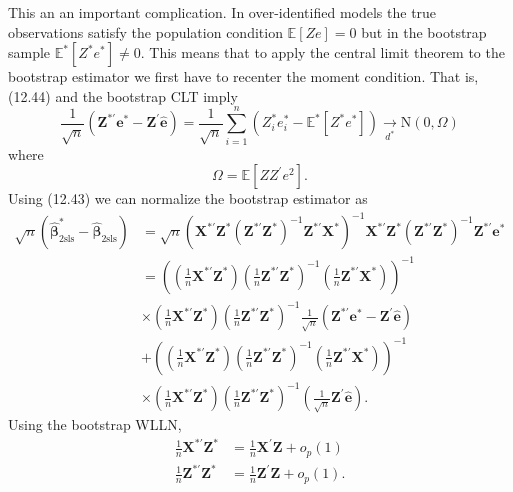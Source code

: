 \documentclass[10pt]{article}
\begin{document}
This an an important complication. In over-identified models the true observations satisfy the population condition $\mathbb{E}[Z e]=0$ but in the bootstrap sample $\mathbb{E}^{*}\left[Z^{*} e^{*}\right] \neq 0$. This means that to apply the central limit theorem to the bootstrap estimator we first have to recenter the moment condition. That is, (12.44) and the bootstrap CLT imply
$$
\frac{1}{\sqrt{n}}\left(\boldsymbol{Z}^{* \prime} \boldsymbol{e}^{*}-\boldsymbol{Z}^{\prime} \widehat{\boldsymbol{e}}\right)=\frac{1}{\sqrt{n}} \sum_{i=1}^{n}\left(Z_{i}^{*} e_{i}^{*}-\mathbb{E}^{*}\left[Z^{*} e^{*}\right]\right) \underset{d^{*}}{\longrightarrow} \mathrm{N}(0, \Omega)
$$
where
$$
\Omega=\mathbb{E}\left[Z Z^{\prime} e^{2}\right] .
$$
Using (12.43) we can normalize the bootstrap estimator as
$$
\begin{aligned}
\sqrt{n}\left(\widehat{\boldsymbol{\beta}}_{2 \mathrm{sls}}^{*}-\widehat{\boldsymbol{\beta}}_{2 \mathrm{sls}}\right) &=\sqrt{n}\left(\boldsymbol{X}^{* \prime} \boldsymbol{Z}^{*}\left(\boldsymbol{Z}^{* \prime} \boldsymbol{Z}^{*}\right)^{-1} \boldsymbol{Z}^{* \prime} \boldsymbol{X}^{*}\right)^{-1} \boldsymbol{X}^{* \prime} \boldsymbol{Z}^{*}\left(\boldsymbol{Z}^{* \prime} \boldsymbol{Z}^{*}\right)^{-1} \boldsymbol{Z}^{* \prime} \boldsymbol{e}^{*} \\
&=\left(\left(\frac{1}{n} \boldsymbol{X}^{* \prime} \boldsymbol{Z}^{*}\right)\left(\frac{1}{n} \boldsymbol{Z}^{* \prime} \boldsymbol{Z}^{*}\right)^{-1}\left(\frac{1}{n} \boldsymbol{Z}^{* \prime} \boldsymbol{X}^{*}\right)\right)^{-1} \\
& \times\left(\frac{1}{n} \boldsymbol{X}^{* \prime} \boldsymbol{Z}^{*}\right)\left(\frac{1}{n} \boldsymbol{Z}^{* \prime} \boldsymbol{Z}^{*}\right)^{-1} \frac{1}{\sqrt{n}}\left(\boldsymbol{Z}^{* \prime} \boldsymbol{e}^{*}-\boldsymbol{Z}^{\prime} \widehat{\boldsymbol{e}}\right) \\
&+\left(\left(\frac{1}{n} \boldsymbol{X}^{* \prime} \boldsymbol{Z}^{*}\right)\left(\frac{1}{n} \boldsymbol{Z}^{* \prime} \boldsymbol{Z}^{*}\right)^{-1}\left(\frac{1}{n} \boldsymbol{Z}^{* \prime} \boldsymbol{X}^{*}\right)\right)^{-1} \\
& \times\left(\frac{1}{n} \boldsymbol{X}^{* \prime} \boldsymbol{Z}^{*}\right)\left(\frac{1}{n} \boldsymbol{Z}^{* \prime} \boldsymbol{Z}^{*}\right)^{-1}\left(\frac{1}{\sqrt{n}} \boldsymbol{Z}^{\prime} \widehat{\boldsymbol{e}}\right) .
\end{aligned}
$$
Using the bootstrap WLLN,
$$
\begin{aligned}
\frac{1}{n} \boldsymbol{X}^{* \prime} \boldsymbol{Z}^{*} &=\frac{1}{n} \boldsymbol{X}^{\prime} \boldsymbol{Z}+o_{p}(1) \\
\frac{1}{n} \boldsymbol{Z}^{* \prime} \boldsymbol{Z}^{*} &=\frac{1}{n} \boldsymbol{Z}^{\prime} \boldsymbol{Z}+o_{p}(1) .
\end{aligned}
$$
\end{document}
